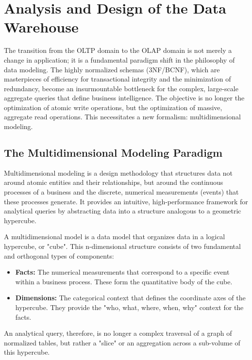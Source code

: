 \section{Analysis and Design of the Data Warehouse}
The transition from the OLTP domain to the OLAP domain is not merely a change in application; it is a fundamental paradigm shift in the philosophy of data modeling. The highly normalized schemas (3NF/BCNF), which are masterpieces of efficiency for transactional integrity and the minimization of redundancy, become an insurmountable bottleneck for the complex, large-scale aggregate queries that define business intelligence. The objective is no longer the optimization of atomic write operations, but the optimization of massive, aggregate read operations. This necessitates a new formalism: multidimensional modeling.

\subsection{The Multidimensional Modeling Paradigm}
Multidimensional modeling is a design methodology that structures data not around atomic entities and their relationships, but around the continuous processes of a business and the discrete, numerical measurements (events) that these processes generate. It provides an intuitive, high-performance framework for analytical queries by abstracting data into a structure analogous to a geometric hypercube.

\begin{definition}
A multidimensional model is a data model that organizes data in a logical hypercube, or "cube". This n-dimensional structure consists of two fundamental and orthogonal types of components:
\begin{itemize}
    \item \textbf{Facts:} The numerical measurements that correspond to a specific event within a business process. These form the quantitative body of the cube.
    \item \textbf{Dimensions:} The categorical context that defines the coordinate axes of the hypercube. They provide the "who, what, where, when, why" context for the facts.
\end{itemize}
An analytical query, therefore, is no longer a complex traversal of a graph of normalized tables, but rather a "slice" or an aggregation across a sub-volume of this hypercube.
\end{definition}

